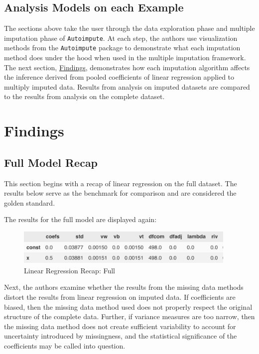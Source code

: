 \documentclass[12pt,oneside]{chicagocapstone}
\begin{document}
\section*{Analysis Models on each
Example}\label{analysis-models-on-each-example}

The sections above take the user through the data exploration phase and
multiple imputation phase of \texttt{Autoimpute}. At each step, the
authors use visualization methods from the \texttt{Autoimpute} package
to demonstrate what each imputation method does under the hood when used
in the multiple imputation framework. The next section,
\protect\hyperlink{findings}{Findings}, demonstrates how each imputation
algorithm affects the inference derived from pooled coefficients of
linear regression applied to multiply imputed data. Results from
analysis on imputed datasets are compared to the results from analysis
on the complete dataset.

\hypertarget{findings}{\chapter*{Findings}\label{findings}}

\section*{Full Model Recap}\label{full-model-recap}

This section begins with a recap of linear regression on the full
dataset. The results below serve as the benchmark for comparison and are
considered the golden standard.

The results for the full model are displayed again:
\begin{figure}

{\centering \includegraphics[width=400px]{figure/full-regression} 

}

\caption{Linear Regression Recap: Full}\label{fig:full-regression-again}
\end{figure}
Next, the authors examine whether the results from the missing data
methods distort the results from linear regression on imputed data. If
coefficients are biased, then the missing data method used does not
properly respect the original structure of the complete data. Further,
if variance measures are too narrow, then the missing data method does
not create sufficient variability to account for uncertainty introduced
by missingness, and the statistical significance of the coefficients may
be called into question.
\end{document}
